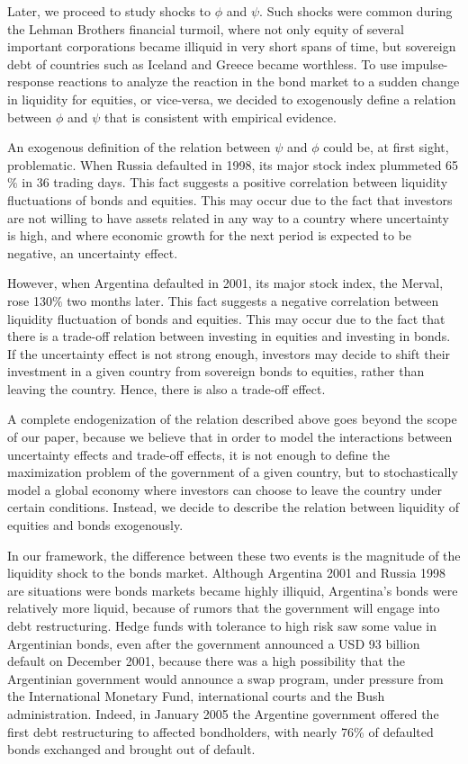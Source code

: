 \documentclass[12pt]{article}%
\begin{document}
Later, we proceed to study shocks to $\phi$ and $\psi$. Such
shocks were common during the Lehman Brothers financial turmoil, where not only equity of
several important corporations became illiquid in very short spans of time,
but sovereign debt of countries such as Iceland and Greece became worthless.
To use impulse-response reactions to analyze the reaction in the bond market to
a sudden change in liquidity for equities, or vice-versa, we decided to exogenously define a relation between $\phi$ and $\psi$ that is
consistent with empirical evidence. 

An exogenous definition of the relation between $\psi$ and $\phi$ could be, at first sight, problematic.
When Russia defaulted in 1998, its major stock index plummeted 65$\%$ in 36 trading
days. This fact suggests a positive correlation between liquidity fluctuations of bonds and
equities. This may occur due to the fact that investors are not willing to have
assets related in any way to a country where uncertainty is high, and where
economic growth for the next period is expected to be negative, an uncertainty
effect.

However, when Argentina defaulted in 2001, its major stock index, the Merval,
rose 130$\%$ two months later. This fact suggests a negative correlation between
liquidity fluctuation of bonds and equities. This may occur due to the fact that
there is a trade-off relation between investing in equities and investing in
bonds. If the uncertainty effect is not strong enough, investors may
decide to shift their investment in a given country from sovereign bonds to
equities, rather than leaving the country. Hence, there is also a trade-off
effect.

A complete endogenization of the relation described above goes beyond the scope of our paper,
because we believe that in order to model the interactions between uncertainty
effects and trade-off effects, it is not enough to define the maximization
problem of the government of a given country, but to stochastically model a global economy
where investors can choose to leave the country under certain conditions. Instead, we decide to describe the relation between liquidity of equities and
bonds exogenously.

In our framework, the difference between these two events is the magnitude of the liquidity
shock to the bonds market. Although Argentina 2001 and
Russia 1998 are situations were bonds markets became
highly illiquid, Argentina's bonds were relatively more liquid, because of
rumors that the government will engage into debt restructuring. Hedge funds with
tolerance to high risk saw some value in Argentinian bonds, even after the
government announced a USD 93 billion default on December 2001, because there was a
high possibility that the Argentinian government would announce a swap program, under
pressure from the International Monetary Fund, international courts and the Bush
administration. Indeed, in January 2005 the Argentine government offered the first
debt restructuring to affected bondholders, with nearly 76\%  of defaulted bonds
exchanged and brought out of default.
\end{document}
